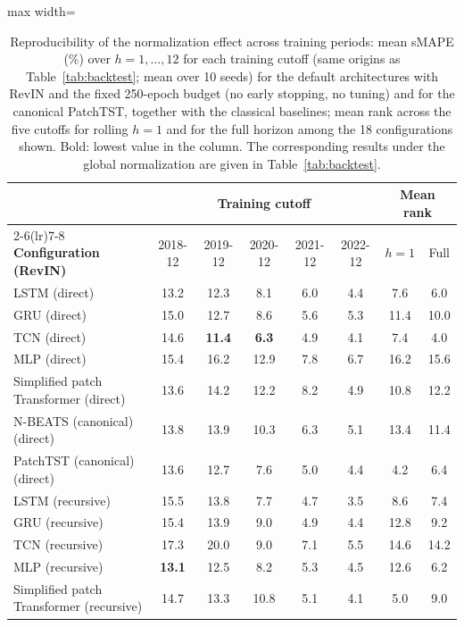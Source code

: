 \begin{table}[htbp]
\centering
\caption{Reproducibility of the normalization effect across training periods: mean sMAPE (\%) over $h=1,\ldots,12$ for each training cutoff (same origins as Table~\ref{tab:backtest}; mean over 10 seeds) for the default architectures with RevIN and the fixed 250-epoch budget (no early stopping, no tuning) and for the canonical PatchTST, together with the classical baselines; mean rank across the five cutoffs for rolling $h=1$ and for the full horizon among the 18 configurations shown. Bold: lowest value in the column. The corresponding results under the global normalization are given in Table~\ref{tab:backtest}.}
\label{tab:r3_backtest}
\vspace{4pt}
\small
\begin{adjustbox}{max width=\textwidth}
\begin{tabular}{lccccccc}
\toprule
& \multicolumn{5}{c}{\textbf{Training cutoff}} & \multicolumn{2}{c}{\textbf{Mean rank}} \\
\cmidrule(lr){2-6}\cmidrule(lr){7-8}
\textbf{Configuration (RevIN)} & 2018-12 & 2019-12 & 2020-12 & 2021-12 & 2022-12 & $h=1$ & Full \\
\midrule
LSTM (direct) & 13.2 & 12.3 & 8.1 & 6.0 & 4.4 & 7.6 & 6.0 \\
GRU (direct) & 15.0 & 12.7 & 8.6 & 5.6 & 5.3 & 11.4 & 10.0 \\
TCN (direct) & 14.6 & \textbf{11.4} & \textbf{6.3} & 4.9 & 4.1 & 7.4 & 4.0 \\
MLP (direct) & 15.4 & 16.2 & 12.9 & 7.8 & 6.7 & 16.2 & 15.6 \\
Simplified patch Transformer (direct) & 13.6 & 14.2 & 12.2 & 8.2 & 4.9 & 10.8 & 12.2 \\
N-BEATS (canonical) (direct) & 13.8 & 13.9 & 10.3 & 6.3 & 5.1 & 13.4 & 11.4 \\
PatchTST (canonical) (direct) & 13.6 & 12.7 & 7.6 & 5.0 & 4.4 & 4.2 & 6.4 \\
\addlinespace
LSTM (recursive) & 15.5 & 13.8 & 7.7 & 4.7 & 3.5 & 8.6 & 7.4 \\
GRU (recursive) & 15.4 & 13.9 & 9.0 & 4.9 & 4.4 & 12.8 & 9.2 \\
TCN (recursive) & 17.3 & 20.0 & 9.0 & 7.1 & 5.5 & 14.6 & 14.2 \\
MLP (recursive) & \textbf{13.1} & 12.5 & 8.2 & 5.3 & 4.5 & 12.6 & 6.2 \\
Simplified patch Transformer (recursive) & 14.7 & 13.3 & 10.8 & 5.1 & 4.1 & 5.0 & 9.0 \\

\end{tabular}
\end{adjustbox}
\end{table}
